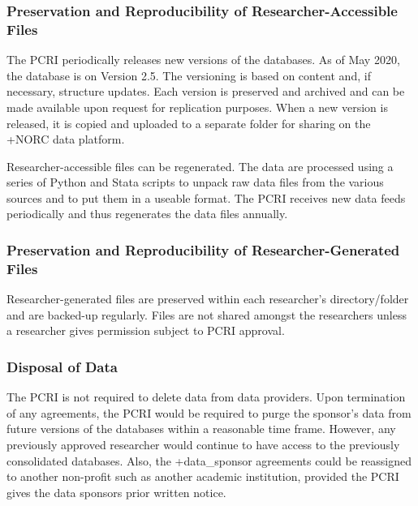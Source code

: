 \documentclass[
]{WileySix}
\begin{document}
\hypertarget{preservation-and-reproducibility-of-researcher-accessible-files-2}{%
\subsubsection{Preservation and Reproducibility of Researcher-Accessible Files}\label{preservation-and-reproducibility-of-researcher-accessible-files-2}}

The PCRI periodically releases new versions of the databases. As of May 2020, the database is on Version 2.5. The versioning is based on content and, if necessary, structure updates. Each version is preserved and archived and can be made available upon request for replication purposes. When a new version is released, it is copied and uploaded to a separate folder for sharing on the +NORC\textbar{} data platform.

Researcher-accessible files can be regenerated. The data are processed using a series of Python and Stata scripts to unpack raw data files from the various sources and to put them in a useable format. The PCRI receives new data feeds periodically and thus regenerates the data files annually.

\hypertarget{preservation-and-reproducibility-of-researcher-generated-files-2}{%
\subsubsection{Preservation and Reproducibility of Researcher-Generated Files}\label{preservation-and-reproducibility-of-researcher-generated-files-2}}

Researcher-generated files are preserved within each researcher's directory/folder and are backed-up regularly. Files are not shared amongst the researchers unless a researcher gives permission subject to PCRI approval.

\hypertarget{disposal-of-data}{%
\subsubsection{Disposal of Data}\label{disposal-of-data}}

The PCRI is not required to delete data from data providers. Upon termination of any agreements, the PCRI would be required to purge the sponsor's data from future versions of the databases within a reasonable time frame. However, any previously approved researcher would continue to have access to the previously consolidated databases. Also, the +data\_sponsor\textbar{} agreements could be reassigned to another non-profit such as another academic institution, provided the PCRI gives the data sponsors prior written notice.
\end{document}
